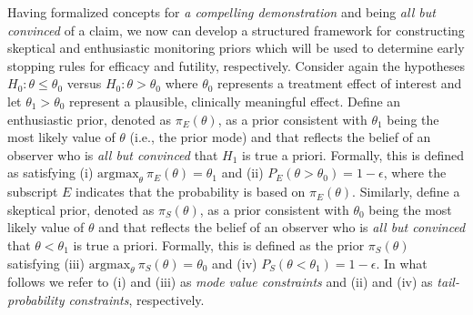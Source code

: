 \documentclass[12pt]{article}
\begin{document}
Having formalized concepts for \textit{a compelling demonstration} and  being \textit{all but convinced} of a claim, we now can develop a structured framework for constructing skeptical and enthusiastic monitoring priors which will be used to determine early stopping rules for efficacy and futility, respectively.
%
Consider again the hypotheses $H_0: \theta \le \theta_0$ versus $H_0: \theta > \theta_0$ where $\theta_0$ represents a 
treatment effect of interest and let $\theta_1>\theta_0$ represent a plausible, clinically meaningful effect.
%
Define an enthusiastic prior, denoted as $\pi_{E}(\theta)$, as a prior consistent with $\theta_1$ being the most 
likely value of $\theta$ (i.e., the prior mode) and that reflects the belief of an observer who is 
\textit{all but convinced} that $H_1$ is true a priori. 
%
Formally, this is defined as satisfying (i) $\text{argmax}_\theta~\pi_E(\theta)=\theta_1$
and (ii) $P_E(\theta >\theta_0)=1-\epsilon$, where the subscript $E$ indicates that the probability is 
based on $\pi_{E}(\theta)$.
%
Similarly, define a skeptical prior, denoted as $\pi_{S}(\theta)$, as a prior consistent with $\theta_0$ being the most 
likely value of $\theta$ and that reflects the belief of an observer who is \textit{all but convinced} that 
$\theta <\theta_1$ is true a priori. 
%
Formally, this is defined as the prior $\pi_{S}(\theta)$ satisfying
(iii) $\text{argmax}_\theta~\pi_S(\theta)=\theta_0$  and (iv) $P_S(\theta <\theta_1)=1-\epsilon$.
%
In what follows we refer to (i) and (iii) as \textit{mode value constraints} and (ii) and (iv) as \textit{tail-probability constraints}, respectively.

\end{document}
